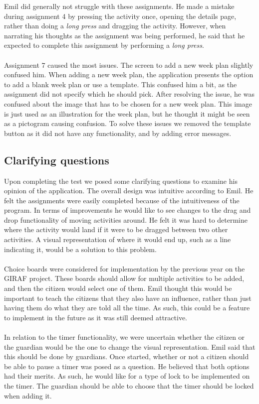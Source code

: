 \noindent
Emil did generally not struggle with these assignments.
He made a mistake during assignment 4 by pressing the activity once, opening the details page, rather than doing a \textit{long press} and dragging the activity.
However, when narrating his thoughts as the assignment was being performed, he said that he expected to complete this assignment by performing a \textit{long press}.
\\\\
Assignment 7 caused the most issues. 
The screen to add a new week plan slightly confused him.
When adding a new week plan, the application presents the option to add a blank week plan or use a template.
This confused him a bit, as the assignment did not specify which he should pick.
After resolving the issue, he was confused about the image that has to be chosen for a new week plan.
This image is just used as an illustration for the week plan, but he thought it might be seen as a pictogram causing confusion.
To solve these issues we removed the template button as it did not have any functionality, and by adding error messages.

\subsection{Clarifying questions}
Upon completing the test we posed some clarifying questions to examine his opinion of the application.
The overall design was intuitive according to Emil.
He felt the assignments were easily completed because of the intuitiveness of the program.
In terms of improvements he would like to see changes to the drag and drop functionality of moving activities around.
He felt it was hard to determine where the activity would land if it were to be dragged between two other activities.
A visual representation of where it would end up, such as a line indicating it, would be a solution to this problem.
\\\\
Choice boards were considered for implementation by the previous year on the GIRAF project.
These boards should allow for multiple activities to be added, and then the citizen would select one of them.
Emil thought this would be important to teach the citizens that they also have an influence, rather than just having them do what they are told all the time.
As such, this could be a feature to implement in the future as it was still deemed attractive.
\\\\
In relation to the timer functionality, we were uncertain whether the citizen or the guardian would be the one to change the visual representation.
Emil said that this should be done by guardians.
Once started, whether or not a citizen should be able to pause a timer was posed as a question.
He believed that both options had their merits. 
As such, he would like for a type of lock to be implemented on the timer.
The guardian should be able to choose that the timer should be locked when adding it.

